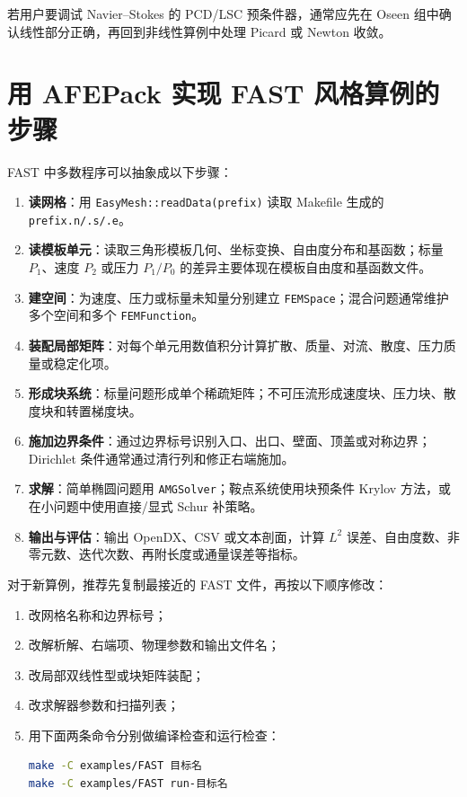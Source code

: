 \documentclass[UTF8,openany,zihao=-4,scheme=chinese]{ctexbook}
\newcommand{\file}[1]{\nolinkurl{#1}}
\newcommand{\class}[1]{\texttt{#1}}
\begin{document}
若用户要调试 Navier--Stokes 的 PCD/LSC 预条件器，通常应先在 Oseen 组中确认线性部分正确，再回到非线性算例中处理 Picard 或 Newton 收敛。

\section{用 AFEPack 实现 FAST 风格算例的步骤}

FAST 中多数程序可以抽象成以下步骤：

\begin{enumerate}[leftmargin=2em]
  \item \textbf{读网格}：用 \class{EasyMesh::readData(prefix)} 读取 Makefile 生成的 \file{prefix.n/.s/.e}。
  \item \textbf{读模板单元}：读取三角形模板几何、坐标变换、自由度分布和基函数；标量 $P_1$、速度 $P_2$ 或压力 $P_1/P_0$ 的差异主要体现在模板自由度和基函数文件。
  \item \textbf{建空间}：为速度、压力或标量未知量分别建立 \class{FEMSpace}；混合问题通常维护多个空间和多个 \class{FEMFunction}。
  \item \textbf{装配局部矩阵}：对每个单元用数值积分计算扩散、质量、对流、散度、压力质量或稳定化项。
  \item \textbf{形成块系统}：标量问题形成单个稀疏矩阵；不可压流形成速度块、压力块、散度块和转置梯度块。
  \item \textbf{施加边界条件}：通过边界标号识别入口、出口、壁面、顶盖或对称边界；Dirichlet 条件通常通过清行列和修正右端施加。
  \item \textbf{求解}：简单椭圆问题用 \class{AMGSolver}；鞍点系统使用块预条件 Krylov 方法，或在小问题中使用直接/显式 Schur 补策略。
  \item \textbf{输出与评估}：输出 OpenDX、CSV 或文本剖面，计算 $L^2$ 误差、自由度数、非零元数、迭代次数、再附长度或通量误差等指标。
\end{enumerate}

对于新算例，推荐先复制最接近的 FAST 文件，再按以下顺序修改：

\begin{enumerate}[leftmargin=2em]
  \item 改网格名称和边界标号；
  \item 改解析解、右端项、物理参数和输出文件名；
  \item 改局部双线性型或块矩阵装配；
  \item 改求解器参数和扫描列表；
  \item 用下面两条命令分别做编译检查和运行检查：
\begin{lstlisting}[language=bash]
make -C examples/FAST 目标名
make -C examples/FAST run-目标名
\end{lstlisting}
\end{enumerate}
\end{document}
